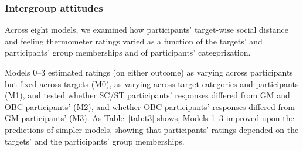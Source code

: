 \documentclass[12pt, a4paper]{article}
\begin{document}
\subsubsection{Intergroup attitudes}

Across eight models, we examined how participants’ target-wise social distance and feeling thermometer ratings varied as a function of the targets’ and participants’ group memberships and of participants’ categorization. 

Models 0--3 estimated ratings (on either outcome) as varying across participants but fixed across targets (M0), as varying across target categories and participants (M1), and tested whether SC/ST participants’ responses differed from GM and OBC participants’ (M2), and whether OBC participants’ responses differed from GM participants’ (M3). As Table~\ref{tab:t3} shows, Models 1--3 improved upon the predictions of simpler models, showing that participants’ ratings depended on the targets’ and the participants’ group memberships.
\end{document}
